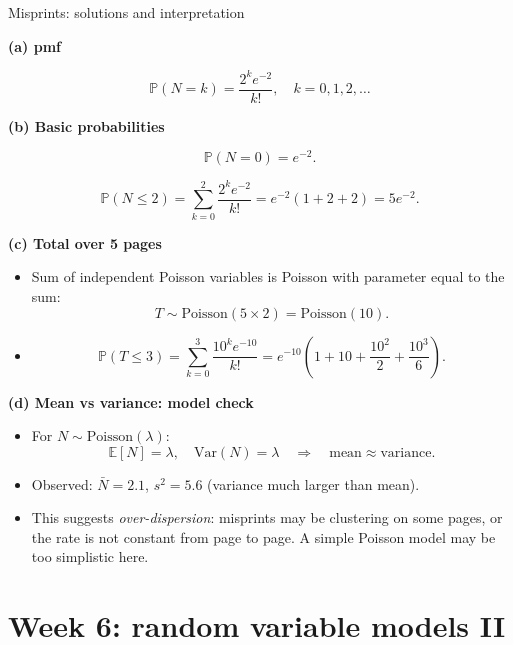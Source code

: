 \documentclass[t,8pt]{beamer}
\begin{document}
\begin{frame}{Misprints: solutions and interpretation}
	
	\textbf{(a) pmf}
	
	\[
	\mathbb{P}(N = k) = \frac{2^k e^{-2}}{k!}, \quad k = 0,1,2,\dots
	\]
	
	\medskip
	\textbf{(b) Basic probabilities}
	
	\[
	\mathbb{P}(N=0) = e^{-2}.
	\]
	
	\[
	\mathbb{P}(N \le 2)
	= \sum_{k=0}^2 \frac{2^k e^{-2}}{k!}
	= e^{-2}(1 + 2 + 2)
	= 5 e^{-2}.
	\]
	
	\medskip
	\textbf{(c) Total over 5 pages}
	
	\begin{itemize}
		\item Sum of independent Poisson variables is Poisson with parameter equal to the sum:
		\[
		T \sim \mathrm{Poisson}(5 \times 2) = \mathrm{Poisson}(10).
		\]
		\item
		\[
		\mathbb{P}(T \le 3) = \sum_{k=0}^{3} \frac{10^k e^{-10}}{k!}
		= e^{-10}\left(1 + 10 + \frac{10^2}{2} + \frac{10^3}{6}\right).
		\]
	\end{itemize}
	
	\medskip
	\textbf{(d) Mean vs variance: model check}
	
	\begin{itemize}
		\item For $N \sim \mathrm{Poisson}(\lambda)$:
		\[
		\mathbb{E}[N] = \lambda, \quad \mathrm{Var}(N) = \lambda
		\quad \Rightarrow \quad \text{mean} \approx \text{variance}.
		\]
		\item Observed: $\bar{N} = 2.1$, $s^2 = 5.6$ (variance much larger than mean).
		\item This suggests \emph{over-dispersion}: misprints may be clustering on some pages,
		or the rate is not constant from page to page. A simple Poisson model may be too
		simplistic here.
	\end{itemize}
	
\end{frame}




\section{Week 6: random variable models II}
\end{document}
